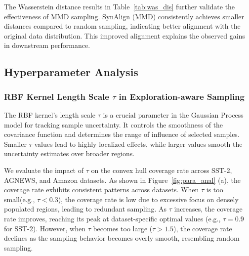 The Wasserstein distance results in Table~\ref{tab:was_dis} further validate the effectiveness of MMD sampling. SynAlign (MMD) consistently achieves smaller distances compared to random sampling, indicating better alignment with the original data distribution. This improved alignment explains the observed gains in downstream performance.


\subsection{Hyperparameter Analysis}



\subsubsection{RBF Kernel Length Scale $\tau$ in Exploration-aware Sampling}

The RBF kernel's length scale $\tau$ is a crucial parameter in the Gaussian Process model for tracking sample uncertainty. It controls the smoothness of the covariance function and determines the range of influence of selected samples. Smaller $\tau$ values lead to highly localized effects, while larger values smooth the uncertainty estimates over broader regions.

We evaluate the impact of $\tau$ on the convex hull coverage rate across SST-2, AGNEWS, and Amazon datasets. As shown in Figure~\ref{fig:para_anal} (a), the coverage rate exhibits consistent patterns across datasets. When $\tau$ is too small(e.g., $\tau < 0.3$), the coverage rate is low due to excessive focus on densely populated regions, leading to redundant sampling. As $\tau$ increases, the coverage rate improves, reaching its peak at dataset-specific optimal values (e.g., $\tau = 0.9$ for SST-2). However, when $\tau$ becomes too large ($\tau > 1.5$), the coverage rate declines as the sampling behavior becomes overly smooth, resembling random sampling. 

